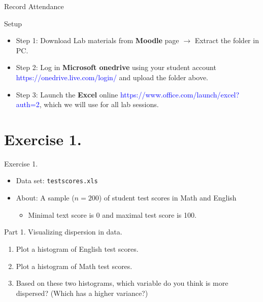 \documentclass[
  10pt,
  ignorenonframetext,
]{beamer}
\providecommand{\tightlist}{%
  \setlength{\itemsep}{0pt}\setlength{\parskip}{0pt}}
\begin{document}
\begin{frame}{Record Attendance}
\protect\hypertarget{record-attendance}{}
\end{frame}

\begin{frame}{Setup}
\protect\hypertarget{setup}{}
\begin{itemize}
\item
  Step 1: Download Lab materials from \textbf{Moodle} page
  \(\rightarrow\) Extract the folder in PC.
\item
  Step 2: Log in \textbf{Microsoft onedrive} using your student account
  \textcolor{blue}{https://onedrive.live.com/login/} and upload the
  folder above.
\item
  Step 3: Launch the \textbf{Excel} online
  \textcolor{blue}{https://www.office.com/launch/excel?auth=2}, which we
  will use for all lab sessions.
\end{itemize}
\end{frame}

\hypertarget{exercise-1.}{%
\section{Exercise 1.}\label{exercise-1.}}

\begin{frame}{Exercise 1.}
\begin{itemize}
\tightlist
\item
  Data set: \texttt{testscores.xls}
\item
  About: A sample (\(n=200\)) of student test scores in Math and English

  \begin{itemize}
  \tightlist
  \item
    Minimal text score is 0 and maximal test score is 100.
  \end{itemize}
\end{itemize}
\end{frame}

\begin{frame}{Part 1. Visualizing dispersion in data.}
\protect\hypertarget{part-1.-visualizing-dispersion-in-data.}{}
\begin{enumerate}
\tightlist
\item
  Plot a histogram of English test scores.
\item
  Plot a histogram of Math test scores.
\item
  Based on these two histograms, which variable do you think is more
  dispersed? (Which has a higher variance?)
\end{enumerate}
\end{frame}
\end{document}
